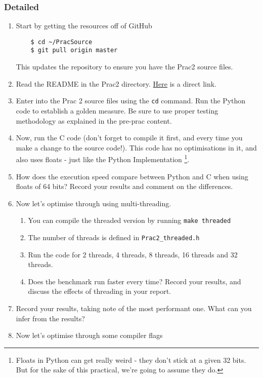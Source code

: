 \subsubsection{Detailed}
\begin{enumerate}
    \item Start by getting the resources off of GitHub
    \begin{lstlisting}
    $ cd ~/PracSource
    $ git pull origin master
    \end{lstlisting}
    This updates the repository to ensure you have the Prac2 source files.
    \item Read the README in the Prac2 directory. \href{https://github.com/kcranky/EEE3096S/blob/master/Prac2/README.md}{Here} is a direct link.
    \item Enter into the Prac 2 source files using the \verb|cd| command. Run the Python code to establish a golden measure. Be sure to use proper testing methodology as explained in the pre-prac content.
    \item Now, run the C code (don't forget to compile it first, and every time you make a change to the source code!). This code has no optimisations in it, and also uses floats - just like the Python Implementation \footnote{Floats in Python can get really weird - they don't stick at a given 32 bits. But for the sake of this practical, we're going to assume they do.}. 
    \item How does the execution speed compare between Python and C when using floats of 64 bits? Record your results and comment on the differences.
    \item Now let's optimise through using multi-threading.
    \begin{enumerate}
        \item You can compile the threaded version by running \verb|make threaded|
        \item The number of threads is defined in \verb|Prac2_threaded.h|
        \item Run the code for 2 threads, 4 threads, 8 threads, 16 threads and 32 threads.
        \item Does the benchmark run faster every time? Record your results, and discuss the effects of threading in your report.
    \end{enumerate}
    \item Record your results, taking note of the most performant one. What can you infer from the results?
    \item Now let's optimise through some compiler flags

\end{enumerate}
